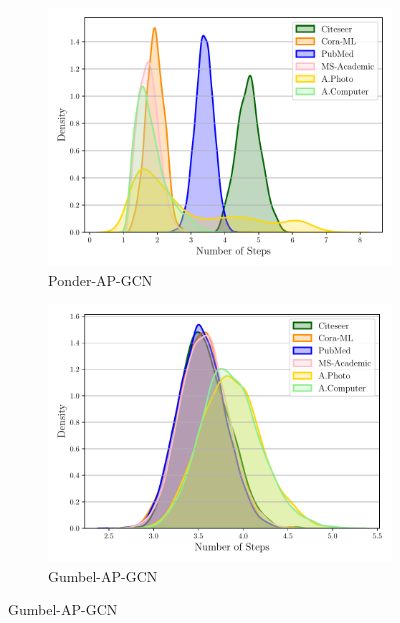 \documentclass{gdl}
\begin{document}
\begin{figure}[p]
\begin{minipage}[t]{0.48\textwidth}
        \begin{subfigure}[b]{0.7\textwidth}
            \centering
            \includegraphics[width=\textwidth]{Ponder-AP-GCN_steps_distribution.pdf}
            \captionsetup{justification=centerlast}
            \caption{Ponder-AP-GCN}
            \label{fig:step_dist_Ponder_AP_GCN}
        \end{subfigure}
        
        \begin{subfigure}[b]{0.7\textwidth}
            \centering
            \includegraphics[width=\textwidth]{Gumbel-AP-GCN_steps_distribution.pdf}
            \captionsetup{justification=centerlast}
            \caption{Gumbel-AP-GCN}
            \label{fig:step_dist_Gumbel_AP_GCN}
        \end{subfigure}
        

\end{minipage}
\end{figure}
\end{document}
